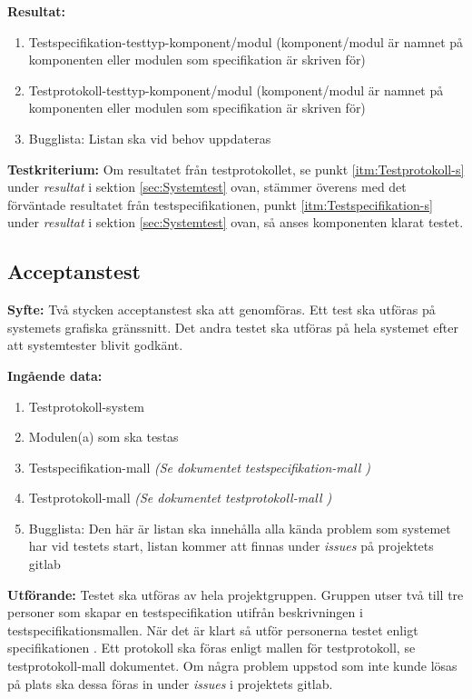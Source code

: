 \documentclass[a4paper,10pt]{article}
\begin{document}
\textbf{Resultat:}
    \begin{enumerate}
        \item \label{itm:Testspecifikation-s}
        Testspecifikation-testtyp-komponent/modul (komponent/modul är namnet på
        komponenten eller modulen som specifikation är skriven för)
        \item \label{itm:Testprotokoll-s} Testprotokoll-testtyp-komponent/modul
        (komponent/modul är namnet på komponenten eller modulen som
        specifikation är skriven för)
        \item Bugglista: Listan ska vid behov uppdateras
    \end{enumerate}

\textbf{Testkriterium:} Om resultatet från testprotokollet, se punkt
\ref{itm:Testprotokoll-s} under \emph{resultat} i sektion \ref{sec:Systemtest}
ovan, stämmer överens med det förväntade resultatet från testspecifikationen,
punkt \ref{itm:Testspecifikation-s} under \emph{resultat} i sektion
\ref{sec:Systemtest} ovan, så anses komponenten klarat testet.

\subsection{Acceptanstest}
\textbf{Syfte:}
Två stycken acceptanstest ska att genomföras. Ett test ska utföras på systemets
grafiska gränssnitt.  Det andra testet ska utföras på hela systemet efter att
systemtester blivit godkänt.

\textbf{Ingående data:}
        \begin{enumerate}
            \item Testprotokoll-system
            \item Modulen(a) som ska testas
            \item Testspecifikation-mall
            \emph{(Se dokumentet testspecifikation-mall \cite{testspec-mall})}
            \item Testprotokoll-mall \emph{(Se
            dokumentet testprotokoll-mall \cite{testprot-mall})}
            \item Bugglista: Den här är listan ska innehålla alla kända problem
            som systemet har vid testets start, listan kommer att finnas under
            \emph{issues} på projektets gitlab
        \end{enumerate}

\textbf{Utförande:} Testet ska utföras av hela projektgruppen. Gruppen utser
två till tre personer som skapar en testspecifikation utifrån beskrivningen i
testspecifikationsmallen. När det är klart så utför personerna testet enligt
specifikationen \cite{kravspec}. Ett protokoll ska föras enligt mallen för
testprotokoll, se testprotokoll-mall dokumentet. Om några problem uppstod som
inte kunde lösas på plats ska dessa föras in under \emph{issues} i projektets
gitlab.
\end{document}
